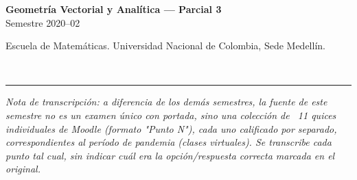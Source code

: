 \documentclass[11pt]{article}
\newcommand{\nota}[1]{{\small\itshape\color{unalblue!70!black} #1}}
\begin{document}
\noindent
\begin{minipage}[t]{0.6\linewidth}
{\small\bfseries Geometría Vectorial y Analítica --- Parcial 3}\\
{\small Semestre 2020--02}
\end{minipage}%
\hfill
\begin{minipage}[t]{0.35\linewidth}
\raggedleft\small Escuela de Matemáticas. Universidad Nacional de Colombia, Sede Medellín.
\end{minipage}\\[2pt]
\rule{\linewidth}{0.6pt}

\vspace{4pt}
\nota{Nota de transcripción: a diferencia de los demás semestres, la fuente de este semestre no es un examen único con portada, sino una colección de ~11 quices individuales de Moodle (formato "Punto N"), cada uno calificado por separado, correspondientes al período de pandemia (clases virtuales). Se transcribe cada punto tal cual, sin indicar cuál era la opción/respuesta correcta marcada en el original.}
\end{document}
